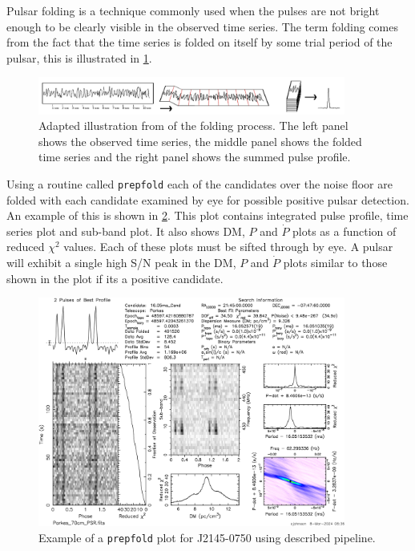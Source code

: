 Pulsar folding is a technique commonly used when the pulses are not bright enough to be clearly visible in the observed time series. The term folding comes from the fact that the time series is folded on itself by some trial period of the pulsar, this is illustrated in \cref{fig: folding}. 

\begin{figure}
    \centering
    \includegraphics[width = 0.9\textwidth]{figs/folding.png}
    \caption{Adapted illustration from \cite{folding_picture} of the folding process. The left panel shows the observed time series, the middle panel shows the folded time series and the right panel shows the summed pulse profile.}
    \label{fig: folding}
\end{figure}

Using a routine called \texttt{prepfold} each of the candidates over the noise floor are folded with each candidate examined by eye for possible positive pulsar detection. An example of this is shown in \cref{fig: prepfold}. This plot contains integrated pulse profile, time series plot and sub-band plot. It also shows DM, $P$ and $\dot P$ plots as a function of reduced $\chi^2$ values. Each of these plots must be sifted through by eye. A pulsar will exhibit a single high S/N peak in the DM, $P$ and $\dot P$ plots similar to those shown in the plot if its a positive candidate. 

\begin{figure}
    \centering
    \includegraphics[width = 0.9\textwidth]{figs/pulsar-cand.png}
    \caption{Example of a \texttt{prepfold} plot for J2145-0750 using described pipeline.}
    \label{fig: prepfold}
\end{figure}

